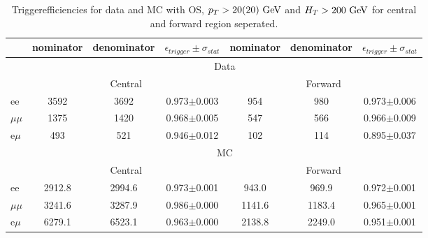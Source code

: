 
\begin{table}[hbp] \caption{Triggerefficiencies for data and MC with OS, $p_T>20(20)\,\,\text{Ge\hspace{-.08em}V}$ and $H_T>200\,\,\text{Ge\hspace{-.08em}V}$ for central and forward region seperated.} 
\centering 
\renewcommand{\arraystretch}{1.2} 
\begin{tabular}{l|c|c|c|c|c|c}     

 & nominator & denominator & $\epsilon_{trigger} \pm \sigma_{stat}$ &  nominator & denominator & $\epsilon_{trigger} \pm \sigma_{stat}$  \\ 
\hline

&\multicolumn{6}{c}{Data} \\
\hline
&  \multicolumn{3}{c|}{Central } & \multicolumn{3}{|c}{ Forward }\\
\hline
ee & 3592 & 3692 & 0.973$\pm$0.003 & 954 & 980 & 0.973$\pm$0.006 \\
$\mu\mu$ & 1375 & 1420 & 0.968$\pm$0.005 & 547 & 566 & 0.966$\pm$0.009 \\
e$\mu$ & 493 & 521 & 0.946$\pm$0.012 & 102 & 114 & 0.895$\pm$0.037 \\
 
 


& \multicolumn{6}{c}{MC} \\
\hline
&  \multicolumn{3}{c|}{Central } & \multicolumn{3}{|c}{ Forward } \\
\hline 
ee & 2912.8 & 2994.6 & 0.973$\pm$0.001 & 943.0 & 969.9 & 0.972$\pm$0.001 \\
$\mu\mu$ & 3241.6 & 3287.9 & 0.986$\pm$0.000 & 1141.6 & 1183.4 & 0.965$\pm$0.001 \\
e$\mu$ & 6279.1 & 6523.1 & 0.963$\pm$0.000 & 2138.8 & 2249.0 & 0.951$\pm$0.001 \\
    
    \hline 
\end{tabular}  
\label{tab:EffValues_Seperated}
\end{table}	
